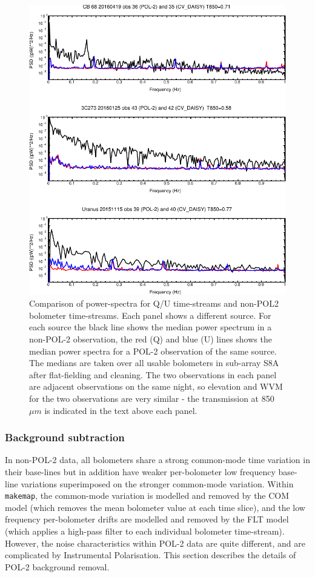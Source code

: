 \documentclass[twoside,11pt]{starlink}
\begin{document}
\begin{figure}
\includegraphics[width=\columnwidth]{qunoise}
\caption{Comparison of power-spectra for Q/U time-streams and non-POL2
bolometer time-streams. Each panel shows a different source. For each
source the black line shows the median power spectrum in a non-POL-2
observation, the red (Q) and blue (U) lines shows the median power
spectra for a POL-2 observation of the same source. The medians are taken
over all usable bolometers in sub-array S8A after flat-fielding and
cleaning. The two observations in each panel are adjacent observations on
the same night, so elevation and WVM for the two observations are very
similar - the transmission at 850 $\mu m$ is indicated in the text above
each panel.}
\label{fig:qunoise}
\end{figure}

\subsubsection{Background subtraction}
\label{sec:back}
In non-POL-2 data, all bolometers share a strong common-mode time variation
in their base-lines but in addition have weaker per-bolometer low
frequency base-line variations superimposed on the stronger common-mode
variation. Within \texttt{makemap}, the common-mode variation is modelled and
removed by the COM model (which removes the mean bolometer value at each
time slice), and the low frequency per-bolometer drifts are
modelled and removed by the FLT model (which applies a high-pass filter
to each individual bolometer time-stream). However, the noise characteristics
within POL-2 data are quite different, and are complicated by Instrumental
Polarisation. This section describes the details of POL-2 background
removal.
\end{document}
